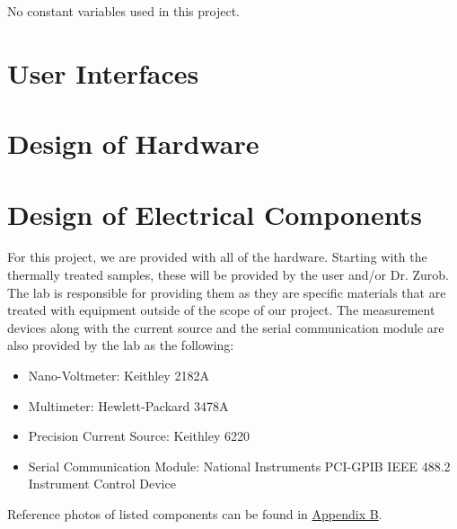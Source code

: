 \documentclass[12pt, titlepage]{article}
\begin{document}
No constant variables used in this project.

\section{User Interfaces}


\section{Design of Hardware}



\section{Design of Electrical Components}


\noindent For this project, we are provided with all of the hardware. Starting with the thermally treated samples, these will be provided by the user and/or Dr. Zurob. The lab is responsible for providing them as they are specific materials that are treated with equipment outside of the scope of our project. The measurement devices along with the current source and the serial communication module are also provided by the lab as the following: 

  \begin{itemize}
    \item Nano-Voltmeter: Keithley 2182A
    \item Multimeter: Hewlett-Packard 3478A
    \item Precision Current Source: Keithley 6220
    \item Serial Communication Module: National Instruments PCI-GPIB IEEE 488.2 Instrument Control Device
  \end{itemize}

\noindent Reference photos of listed components can be found in \hyperref[Apx.HWC]{Appendix B}. \\
\end{document}
